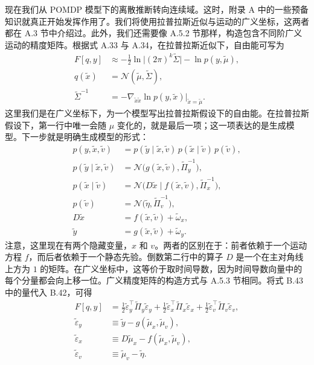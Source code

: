 现在我们从 POMDP 模型下的离散推断转向连续域。这时，附录 A 中的一些预备知识就真正开始发挥作用了。我们将使用拉普拉斯近似与运动的广义坐标，这两者都在 A.3 节中介绍过。此外，我们还需要像 A.5.2 节那样，构造包含不同阶广义运动的精度矩阵。根据式 A.33 与 A.34，在拉普拉斯近似下，自由能可写为
\begin{align}
F[q,y]
&\approx
-\frac{1}{2}\ln \bigl|(2\pi)^k \tilde\Sigma \bigr|
- \ln p(y,\tilde\mu),
\nonumber\\
q(\tilde x)
&=
\mathcal{N}(\tilde\mu,\tilde\Sigma),
\nonumber\\
\tilde\Sigma^{-1}
&=
- \nabla_{\tilde x \tilde x}\ln p(y,\tilde x)\Big|_{\tilde x=\tilde\mu}.
\tag{B.42}
\end{align}
这里我们是在广义坐标下，为一个模型写出拉普拉斯假设下的自由能。在拉普拉斯假设下，第一行中唯一会随 $\mu$ 变化的，就是最后一项；这一项表达的是生成模型。下一步就是明确生成模型的形式：
\begin{align}
p(y,\tilde x,\tilde v)
&=
p(\tilde y \mid \tilde x,\tilde v)\,
p(\tilde x \mid \tilde v)\,
p(\tilde v),
\nonumber\\
p(\tilde y \mid \tilde x,\tilde v)
&=
\mathcal{N}\!\bigl(g(\tilde x,\tilde v), \tilde\Pi_y^{-1}\bigr),
\nonumber\\
p(\tilde x \mid \tilde v)
&=
\mathcal{N}\!\bigl(D\tilde x \mid f(\tilde x,\tilde v), \tilde\Pi_x^{-1}\bigr),
\nonumber\\
p(\tilde v)
&=
\mathcal{N}\!\bigl(\tilde\eta, \tilde\Pi_v^{-1}\bigr),
\nonumber\\
D\tilde x
&=
f(\tilde x,\tilde v) + \tilde\omega_x,
\nonumber\\
\tilde y
&=
g(\tilde x,\tilde v) + \tilde\omega_y.
\tag{B.43}
\end{align}
注意，这里现在有两个隐藏变量，$x$ 和 $v$。两者的区别在于：前者依赖于一个运动方程 $f$，而后者依赖于一个静态先验。倒数第二行中的算子 $D$ 是一个在主对角线上方为 $1$ 的矩阵。在广义坐标中，这等价于取时间导数，因为时间导数向量中的每个分量都会向上移一位。广义精度矩阵的构造方式与 A.5.3 节相同。将式 B.43 中的量代入 B.42，可得
\begin{align}
F[q,y]
&=
\frac{1}{2}\tilde\varepsilon_y^\top \tilde\Pi_y \tilde\varepsilon_y
+ \frac{1}{2}\tilde\varepsilon_x^\top \tilde\Pi_x \tilde\varepsilon_x
+ \frac{1}{2}\tilde\varepsilon_v^\top \tilde\Pi_v \tilde\varepsilon_v,
\nonumber\\
\tilde\varepsilon_y
&\equiv
\tilde y - g(\tilde\mu_x,\tilde\mu_v),
\nonumber\\
\tilde\varepsilon_x
&\equiv
D\tilde\mu_x - f(\tilde\mu_x,\tilde\mu_v),
\nonumber\\
\tilde\varepsilon_v
&\equiv
\tilde\mu_v - \tilde\eta.
\tag{B.44}
\end{align}
